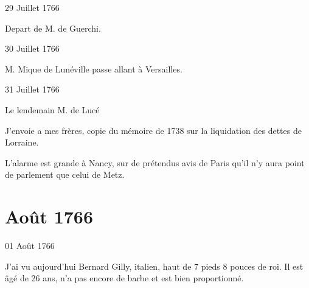                      \begin{diary}{29 Juillet 1766}{}
                        
                         Depart de M. de
                              Guerchi. \bigskip
        
        
                     \end{diary}
                     
                     \begin{diary}{30 Juillet 1766}{}
                        
                        
                           M. Mique de Lunéville passe allant à
                           Versailles. \bigskip
        
        
                     \end{diary}

                     \begin{diary}{31 Juillet 1766}{}
                        
                         Le lendemain M. de
                              Lucé
                        \bigskip
        
        
                         J'envoie a mes
                              frères, copie du mémoire
                              de 1738 sur la liquidation des dettes de
                              Lorraine. \bigskip
        
        
                         L'alarme est grande à Nancy, sur de
                           prétendus avis de Paris qu'il
                           n'y aura
                           point de parlement que celui de
                              Metz. \bigskip
        
        
                     \end{diary}
                  \chapter*{Août 1766}
                     
                     
                     
                     \begin{diary}{01 Août 1766}{}
                        
                         J'ai vu aujourd'hui Bernard Gilly, italien,
                           haut de 7 pieds 8 pouces de roi. Il est âgé de
                           26 ans, n'a pas encore de barbe et est bien
                           proportionné. \bigskip
        
        
                     \end{diary}

